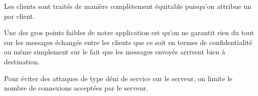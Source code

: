 \documentclass[12pt,english,french]{article}
\newcommand{\texten}[1]{\texteng{\emph{#1}}}
\begin{document}
Les clients sont traités de manière complètement équitable puisqu'on
attribue un \texten{thread} par client.

Une des gros points faibles de notre application est qu'on ne garantit
rien du tout sur les messages échangés entre les clients que ce soit en
termes de confidentialité ou même simplement sur le fait que les
messages envoyés arrivent bien à destination.

Pour éviter des attaques de type déni de service sur le serveur, on
limite le nombre de connexions acceptées par le serveur.
\end{document}
